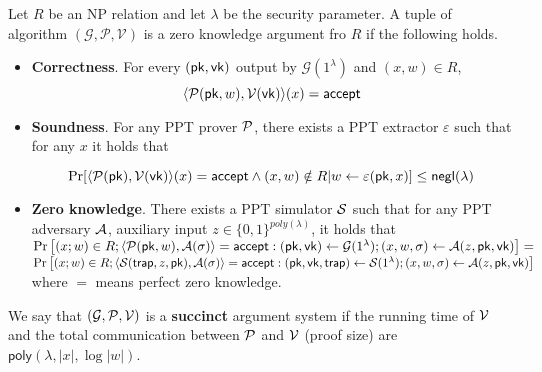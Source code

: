 \begin{definition}\label{def::zkp}
	
	Let $R$ be an NP relation and let $\lambda$ be the security parameter. A tuple of algorithm $(\mathcal{G}, \mathcal{P}, \mathcal{V})$ is a zero knowledge argument fro $R$ if the following holds.
	
	\begin{itemize}
		
		\item \textbf{Correctness}. For every $(\pk, \vk)$ output by $\mathcal{G}(1^\lambda)$ and $(x, w) \in R$, 
		$$\langle \P(\pk, w), \V(\vk) \rangle(x) = \accept$$
		
		\item \textbf{Soundness}. For any PPT prover $\P$, there exists a PPT extractor $\varepsilon$ such that for any $x$ it holds that
		
		$$\Pr[\langle\P(\pk), \V(\vk) \rangle(x) = \accept \wedge (x, w) \notin R | w \leftarrow \varepsilon(\pk, x)] \leq \neg(\lambda)$$
		
		\item \textbf{Zero knowledge}. There exists a PPT simulator $\S$ such that for any PPT adversary $\A$, auxiliary input $z \in \{0, 1\}^{poly(\lambda)}$, it holds that\\
		{\fontsize{8}{8}
		$\Pr\left[(x;w)\in R; \langle\P(\pk,w),\A(\sigma) \rangle=\accept: (\pk,\vk)\leftarrow\mathcal{G}(1^\lambda); (x,w,\sigma)\leftarrow\A(z,\pk,\vk) \right] = $\\
		$\Pr\left[(x;w)\in R; \langle\S(\mathsf{trap}, z, \pk),\A(\sigma) \rangle=\accept:(\pk,\vk,\mathsf{trap})\leftarrow\S(1^\lambda); (x,w,\sigma)\leftarrow\A(z,\pk,\vk)\right]$\\
		}
		where $=$ means perfect zero knowledge. 
		
	\end{itemize}
	We say that $(\mathcal{G},\P,\V)$ is a \textbf{succinct} argument system if the
	running time of $\V$ and the total communication between $\P$ and $\V$ (proof size) are $\mathsf{poly}(\lambda,|x|,\log|w|)$.
\end{definition}



